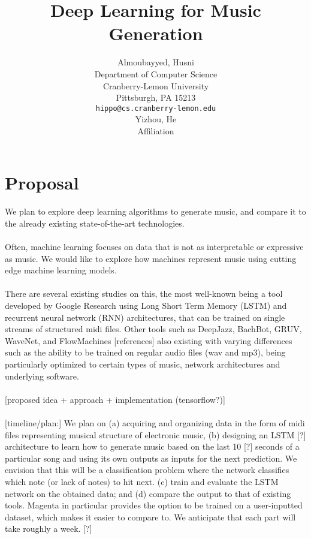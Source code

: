 \documentclass{article}
\title{Deep Learning for Music Generation}
\author{
  Almoubayyed, Husni\\
  Department of Computer Science\\
  Cranberry-Lemon University\\
  Pittsburgh, PA 15213 \\
  \texttt{hippo@cs.cranberry-lemon.edu} \\
   \And
  Yizhou, He \\
  Affiliation\\
}
\begin{document}
\maketitle



\section{Proposal}

\paragraph{}We plan to explore deep learning algorithms to generate music, and compare it to the already existing state-of-the-art technologies.
\paragraph{}
Often, machine learning focuses on data that is not as interpretable or expressive as music.  We would like to explore how machines represent music using cutting edge machine learning models.
\paragraph{}
There are several existing studies on this, the most well-known being a tool developed by Google Research using Long Short Term Memory (LSTM) and recurrent neural network (RNN) architectures, that can be trained on single streams of structured midi files. Other tools such as DeepJazz, BachBot, GRUV, WaveNet, and FlowMachines [references] also existing with varying differences such as the ability to be trained on regular audio files (wav and mp3), being particularly optimized to certain types of music, network architectures and underlying software. 
\paragraph{}
[proposed idea + approach + implementation (tensorflow?)]
\paragraph{}
[timeline/plan:] We plan on (a) acquiring and organizing data in the form of midi files representing musical structure of electronic music, (b) designing an LSTM [?] architecture to learn how to generate music based on the last 10 [?] seconds of a particular song and using its own outputs as inputs for the next prediction. We envision that this will be a classification problem where the network classifies which note (or lack of notes) to hit next. (c) train and evaluate the LSTM network on the obtained data; and (d) compare the output to that of existing tools. Magenta in particular provides the option to be trained on a user-inputted dataset, which makes it easier to compare to. We anticipate that each part will take roughly a week. [?]
\end{document}
